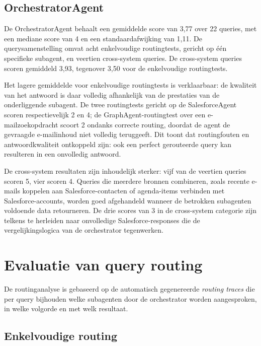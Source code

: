 \subsection*{OrchestratorAgent}

De OrchestratorAgent behaalt een gemiddelde score van 3,77 over 22 queries, met een mediane score van 4 en een standaardafwijking van 1,11. De querysamenstelling omvat acht enkelvoudige routingtests, gericht op één specifieke subagent, en veertien cross-system queries. De cross-system queries scoren gemiddeld 3,93, tegenover 3,50 voor de enkelvoudige routingtests.

Het lagere gemiddelde voor enkelvoudige routingtests is verklaarbaar: de kwaliteit van het antwoord is daar volledig afhankelijk van de prestaties van de onderliggende subagent. De twee routingtests gericht op de SalesforceAgent scoren respectievelijk 2 en 4; de GraphAgent-routingtest over een e-mailzoekopdracht scoort 2 ondanks correcte routing, doordat de agent de gevraagde e-mailinhoud niet volledig teruggeeft. Dit toont dat routingfouten en antwoordkwaliteit ontkoppeld zijn: ook een perfect gerouteerde query kan resulteren in een onvolledig antwoord.

De cross-system resultaten zijn inhoudelijk sterker: vijf van de veertien queries scoren 5, vier scoren 4. Queries die meerdere bronnen combineren, zoals recente e-mails koppelen aan Salesforce-contacten of agenda-items verbinden met Salesforce-accounts, worden goed afgehandeld wanneer de betrokken subagenten voldoende data retourneren. De drie scores van 3 in de cross-system categorie zijn telkens te herleiden naar onvolledige Salesforce-responses die de vergelijkingslogica van de orchestrator tegenwerken.

\section{Evaluatie van query routing}
\label{sec:evaluatie-routing}

De routinganalyse is gebaseerd op de automatisch gegenereerde \textit{routing traces} die per query bijhouden welke subagenten door de orchestrator worden aangesproken, in welke volgorde en met welk resultaat.

\subsection*{Enkelvoudige routing}

